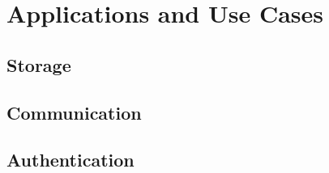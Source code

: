 \chapter{Applications and Use Cases}
\label{chap:apps}

\section{Storage}
\section{Communication}
\section{Authentication}
